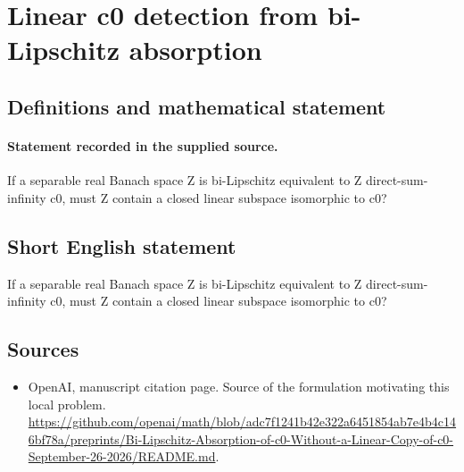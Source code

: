 \documentclass[11pt]{article}
\begin{document}
\section*{Linear c0 detection from bi-Lipschitz absorption}\label{30007178}
\subsection{Definitions and mathematical statement}
\paragraph{Statement recorded in the supplied source.}
If a separable real Banach space Z is bi-Lipschitz equivalent to Z direct-sum-infinity c0, must Z contain a closed linear subspace isomorphic to c0?
\subsection{Short English statement}
If a separable real Banach space Z is bi-Lipschitz equivalent to Z direct-sum-infinity c0, must Z contain a closed linear subspace isomorphic to c0?
\subsection{Sources}
\begin{itemize}
\item[S1] OpenAI, manuscript citation page. Source of the formulation motivating this local problem.
\url{https://github.com/openai/math/blob/adc7f1241b42e322a6451854ab7e4b4c146bf78a/preprints/Bi-Lipschitz-Absorption-of-c0-Without-a-Linear-Copy-of-c0-September-26-2026/README.md}.
\end{itemize}
\end{document}
